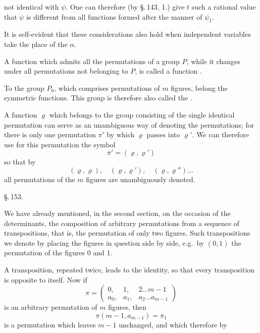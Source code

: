 not identical with $\psi$. One can therefore (by \S.\,143, 1.) give $t$ such a rational value that $\psi$ is different from all functions formed after the manner of $\psi_1$.

It is self-evident that these considerations also hold when independent variables take the place of the $\alpha$.

A function which admits all the permutations of a group $P$, while it changes under all permutations not belonging to $P$, is called a function .

To the group $P_0$, which comprises  permutations of $m$ figures, belong the symmetric functions. This group is therefore also called the .

A function $\varrho$ which belongs to the group consisting of the single identical permutation can serve as an unambiguous way of denoting the permutations; for there is only one permutation $\pi'$ by which $\varrho$ passes into $\varrho'$. We can therefore use for this permutation the symbol
\[
\pi' = (\varrho, \varrho')
\]
so that by
\[
(\varrho, \varrho), \quad (\varrho, \varrho'), \quad (\varrho, \varrho'') \dots
\]
all permutations of the $m$ figures are unambiguously denoted.

\begin{center}
\S.\,153.

\end{center}

We have already mentioned, in the second section, on the occasion of the determinants, the composition of arbitrary permutations from a sequence of transpositions, that is, the permutation of only two figures. Such transpositions we denote by placing the figures in question side by side, e.g.\ by $(0,1)$ the permutation of the figures 0 and 1.

A transposition, repeated twice, leads to the identity, so that every transposition is opposite to itself. Now if
\[
\pi = \begin{pmatrix} 0, & 1, & 2 \dots m-1 \\ a_0, & a_1, & a_2 \dots a_{m-1} \end{pmatrix}
\]
is an arbitrary permutation of $m$ figures, then
\[
\pi(m-1, a_{m-1}) = \pi_1
\]
is a permutation which leaves $m-1$ unchanged, and which therefore by
